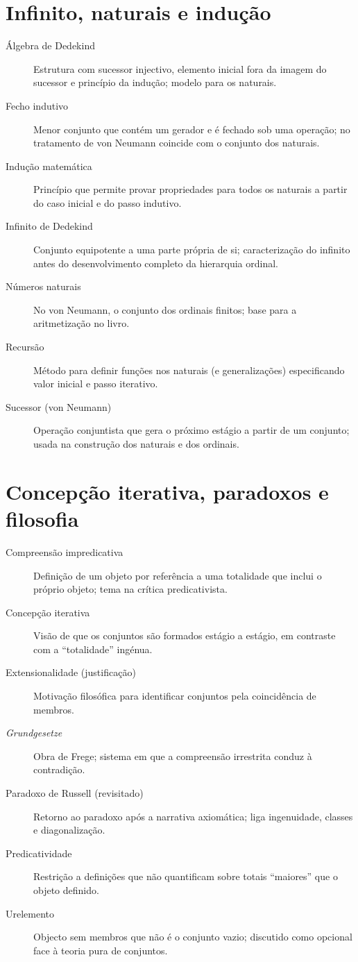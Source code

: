 \section*{Infinito, naturais e indução}

\begin{description}
\item[Álgebra de Dedekind] Estrutura com sucessor injectivo, elemento inicial fora da imagem do sucessor e princípio da indução; modelo para os naturais.
\item[Fecho indutivo] Menor conjunto que contém um gerador e é fechado sob uma operação; no tratamento de von Neumann coincide com o conjunto dos naturais.
\item[Indução matemática] Princípio que permite provar propriedades para todos os naturais a partir do caso inicial e do passo indutivo.
\item[Infinito de Dedekind] Conjunto equipotente a uma parte própria de si; caracterização do infinito antes do desenvolvimento completo da hierarquia ordinal.
\item[Números naturais] No von Neumann, o conjunto dos ordinais finitos; base para a aritmetização no livro.
\item[Recursão] Método para definir funções nos naturais (e generalizações) especificando valor inicial e passo iterativo.
\item[Sucessor (von Neumann)] Operação conjuntista que gera o próximo estágio a partir de um conjunto; usada na construção dos naturais e dos ordinais.
\end{description}

\section*{Concepção iterativa, paradoxos e filosofia}

\begin{description}
\item[Compreensão impredicativa] Definição de um objeto por referência a uma totalidade que inclui o próprio objeto; tema na crítica predicativista.
\item[Concepção iterativa] Visão de que os conjuntos são formados estágio a estágio, em contraste com a ``totalidade'' ingénua.
\item[Extensionalidade (justificação)] Motivação filosófica para identificar conjuntos pela coincidência de membros.
\item[\textit{Grundgesetze}] Obra de Frege; sistema em que a compreensão irrestrita conduz à contradição.
\item[Paradoxo de Russell (revisitado)] Retorno ao paradoxo após a narrativa axiomática; liga ingenuidade, classes e diagonalização.
\item[Predicatividade] Restrição a definições que não quantificam sobre totais ``maiores'' que o objeto definido.
\item[Urelemento] Objecto sem membros que não é o conjunto vazio; discutido como opcional face à teoria pura de conjuntos.
\end{description}

